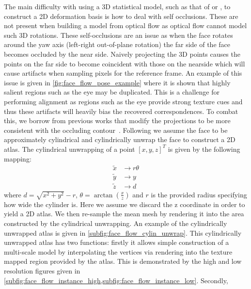 The main difficulty with using a 3D statistical model, such as that of
\citet{paysan20093d} or \citet{booth2016lsfm}, to construct a 2D
deformation basis is how to deal with self occlusions. These are not present when
building a model from optical flow as optical flow cannot model such 3D rotations.
These self-occlusions are an issue as when the face rotates around the yaw axis
(left-right out-of-plane rotation) the far side of the face becomes occluded
by the near side. Naively projecting the 3D points causes the points on the far
side to become coincident with those on the nearside which will cause artifacts
when sampling pixels for the reference frame. An example of this issue
is given in \cref{fig:face_flow_pose_example} where it is shown that highly
salient regions such as the eye may be duplicated. This is a challenge for
performing alignment as regions such as the eye provide strong texture cues and
thus these artifacts will heavily bias the recovered correspondences. To combat
this, we borrow from previous works that modify the projections to be more
consistent with the occluding contour~\cite{Zhu:2015ur,zhu2015high,hassner2015effective}.
Following \citet{zhu2015high} we assume the face to be approximately cylindrical and
cylindrically unwrap the face to construct a 2D atlas. The cylindrical unwrapping
of a point ${[x, y, z]}^T$ is given by the following mapping:
\begin{equation}
    \begin{aligned}
        \tilde{x} &\rightarrow r \theta \\
        \tilde{y} &\rightarrow y \\
        \tilde{z} &\rightarrow d
    \end{aligned}
\end{equation}
where $d = \sqrt{x^2 + y^2} - r$,
$\theta = \arctan{\left(\frac{x}{z}\right)}$ and $r$ is the provided radius
specifying how wide the cylinder is. Here we assume we discard the z
coordinate in order to yield a 2D atlas.
We then re-sample the mean mesh by rendering it into the area constructed by the
cylindrical unwrapping. An example of the cylindrically unwrapped atlas is given
in \cref{subfig:face_flow_cylin_unwrap}.
This cylindrically unwrapped atlas has two functions: firstly it
allows simple construction of a multi-scale model by interpolating the vertices
via rendering into the texture mapped region provided by the atlas.
This is demonstrated by the high
and low resolution figures given in
\cref{subfig:face_flow_instance_high,subfig:face_flow_instance_low}. Secondly,
